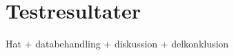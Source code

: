 \chapter{Testresultater}
\label{Testresultater}
%
Hat + databehandling + diskussion + delkonklusion 
%
